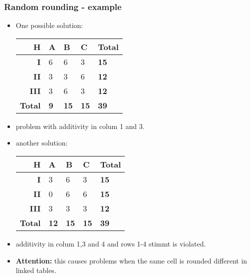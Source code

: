 \begin{frame}\frametitle{Random rounding - example}
	\begin{itemize}
		\item One possible solution:
		\begin{scriptsize}
		\begin{center}
			\begin{tabular}{|r|lll|l|}
			\hline
			{\bf H} & {\bf A} & {\bf B} & {\bf C} & {\bf Total} \\
			\hline
			{\bf I} 	& 6 & 6 & 3 & {\bf 15} \\
			{\bf II} 	& 3 & 3 & 6 & {\bf 12}\\
			{\bf III} & 3 & 6 & 3 & {\bf 12} \\
			\hline
			{\bf Total} & {\bf 9} & {\bf 15} & {\bf 15}  & {\bf 39} \\
			\hline
			\end{tabular}
		\end{center}
		\end{scriptsize}	\pause
		\item problem with additivity in colum 1 and 3. \pause
		\item another solution: \pause
		\begin{scriptsize}
		\begin{center}
			\begin{tabular}{|r|lll|l|}
			\hline
			{\bf H} & {\bf A} & {\bf B} & {\bf C} & {\bf Total} \\
			\hline
			{\bf I} 	& 3 & 6 & 3 & {\bf 15} \\
			{\bf II} 	& 0 & 6 & 6 & {\bf 15}\\
			{\bf III} & 3 & 3 & 3 & {\bf 12} \\
			\hline
			{\bf Total} & {\bf 12} & {\bf 15} & {\bf 15}  & {\bf 39} \\
			\hline
			\end{tabular}
		\end{center}
		\end{scriptsize}	\pause
		\item additivity in colum 1,3 and 4 and rows 1-4 stimmt is violated.\pause
		\item {\bf Attention:} this causes problems when the same cell is rounded different in linked tables.
	\end{itemize}
\end{frame}


